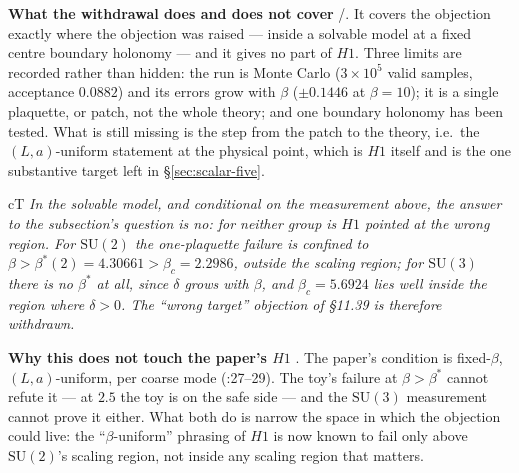 
\textbf{What the withdrawal does and does not cover} \LE{}/\LM. It covers the objection exactly
where the objection was raised --- inside a solvable model at a fixed centre boundary holonomy ---
and it gives no part of $H1$. Three limits are recorded rather than hidden: the run is Monte Carlo
($3\times10^{5}$ valid samples, acceptance $0.0882$) and its errors grow with $\beta$
($\pm0.1446$ at $\beta=10$); it is a single plaquette, or patch, not the whole theory; and one
boundary holonomy has been tested. What is still missing is the step from the patch to the theory,
i.e.\ the $(L,a)$-uniform statement at the physical point, which is $H1$ itself and is the one
substantive target left in \S\ref{sec:scalar-five}.

\begin{claimbox}{cT}
 \emph{In the
solvable model, and conditional on the measurement above, the answer to the subsection's question
is no: for neither group is $H1$ pointed at the wrong region. For $\mathrm{SU}(2)$ the one-plaquette
failure is confined to $\beta>\beta^*(2)=4.30661>\beta_c=2.2986$, outside the scaling region; for
$\mathrm{SU}(3)$ there is no $\beta^*$ at all, since $\delta$ grows with $\beta$, and
$\beta_c=5.6924$ lies well inside the region where $\delta>0$. The ``wrong target'' objection of
\S11.39 is therefore withdrawn.}
\LC{}
\end{claimbox}

\textbf{Why this does not touch the paper's $H1$} \LT. The paper's condition is fixed-$\beta$,
$(L,a)$-uniform, per coarse mode (:27--29). The toy's failure at
$\beta>\beta^*$ cannot refute it --- at $2.5$ the toy is on the safe side --- and the $\mathrm{SU}(3)$
measurement cannot prove it either. What both do is narrow the space in which the objection could
live: the ``$\beta$-uniform'' phrasing of $H1$ is now known to fail only above $\mathrm{SU}(2)$'s
scaling region, not inside any scaling region that matters.

